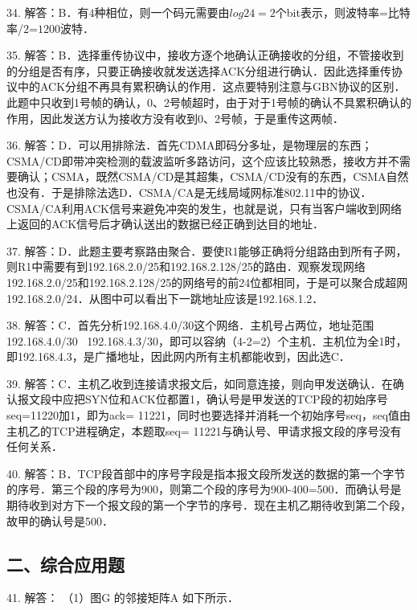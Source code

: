 34. 解答：B．有$4$种相位，则一个码元需要由$log24=2$个bit表示，则波特率=比特率/$2$=$1200$波特．

35. 解答：B．选择重传协议中，接收方逐个地确认正确接收的分组，不管接收到的分组是否有序，只要正确接收就发送选择ACK分组进行确认．因此选择重传协议中的ACK分组不再具有累积确认的作用．这点要特别注意与GBN协议的区别．此题中只收到1号帧的确认，0、2号帧超时，由于对于1号帧的确认不具累积确认的作用，因此发送方认为接收方没有收到0、2号帧，于是重传这两帧．

36. 解答：D．可以用排除法．首先CDMA即码分多址，是物理层的东西；CSMA/CD即带冲突检测的载波监听多路访问，这个应该比较熟悉，接收方并不需要确认；CSMA，既然CSMA/CD是其超集，CSMA/CD没有的东西，CSMA自然也没有．于是排除法选D．CSMA/CA是无线局域网标准802.11中的协议．CSMA/CA利用ACK信号来避免冲突的发生，也就是说，只有当客户端收到网络上返回的ACK信号后才确认送出的数据已经正确到达目的地址．

37. 解答：D．此题主要考察路由聚合．要使R1能够正确将分组路由到所有子网，则R1中需要有到192.168.2.0/25和192.168.2.128/25的路由．观察发现网络192.168.2.0/25和192.168.2.128/25的网络号的前24位都相同，于是可以聚合成超网192.168.2.0/24．从图中可以看出下一跳地址应该是192.168.1.2．

38. 解答：C．首先分析192.168.4.0/30这个网络．主机号占两位，地址范围192.168.4.0/30~ 192.168.4.3/30，即可以容纳（4-2=2）个主机．主机位为全1时，即192.168.4.3，是广播地址，因此网内所有主机都能收到，因此选C．

39. 解答：C．主机乙收到连接请求报文后，如同意连接，则向甲发送确认．在确认报文段中应把SYN位和ACK位都置1，确认号是甲发送的TCP段的初始序号seq=11220加1，即为ack= 11221，同时也要选择并消耗一个初始序号seq，seq值由主机乙的TCP进程确定，本题取seq= 11221与确认号、甲请求报文段的序号没有任何关系．

40. 解答：B．TCP段首部中的序号字段是指本报文段所发送的数据的第一个字节的序号．第三个段的序号为900，则第二个段的序号为900-400=500．而确认号是期待收到对方下一个报文段的第一个字节的序号．现在主机乙期待收到第二个段，故甲的确认号是500．


\subsection{二、综合应用题}

41. 解答：
（1）图G 的邻接矩阵A 如下所示． \\
